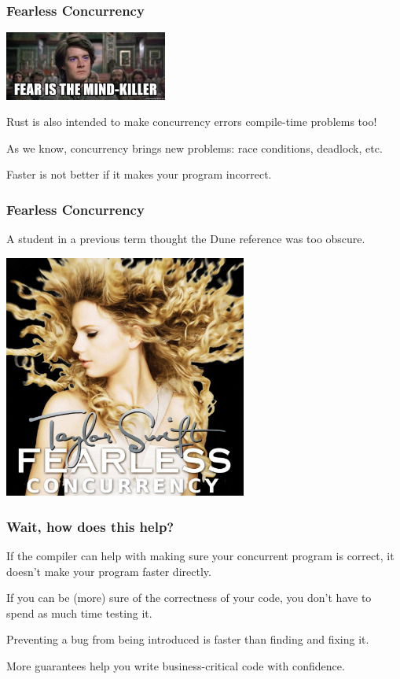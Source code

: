 \begin{frame}
\frametitle{Fearless Concurrency}

\begin{center}
	\includegraphics[width=0.4\textwidth]{images/mindkiller.jpeg}
\end{center}

Rust is also intended to make concurrency errors compile-time problems too! 

As we know, concurrency brings new problems: race conditions, deadlock, etc.

Faster is not better if it makes your program incorrect.

\end{frame}

\begin{frame}
\frametitle{Fearless Concurrency}

A student in a previous term thought the Dune reference was too obscure.

\begin{center}
	\includegraphics[width=0.6\textwidth]{images/fearless-concurrency.jpg}
\end{center}

\end{frame}


\begin{frame}
\frametitle{Wait, how does this help?}

If the compiler can help with making sure your concurrent program is correct, it doesn't make your program faster directly.

If you can be (more) sure of the correctness of your code, you don't have to spend as much time testing it.

Preventing a bug from being introduced is faster than finding and fixing it.

More guarantees help you write business-critical code with confidence.

\end{frame}


